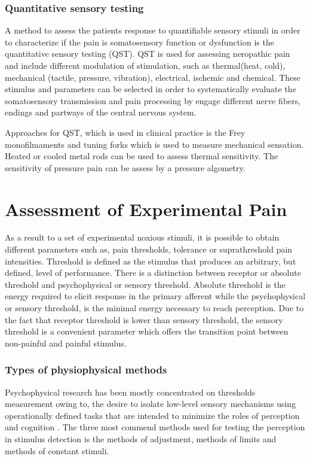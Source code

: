 \subsubsection{Quantitative sensory testing}
A method to assess the patients response to quantifiable sensory stimuli in order to characterize if the pain is somatosensory function or dysfunction is the quantitative sensory testing (QST). QST is used for assessing neropathic pain and include different modulation of stimulation, such as thermal(heat, cold), mechanical (tactile, pressure, vibration), electrical, ischemic and chemical. These stimulus and parameters can be selected in order to systematically evaluate the somatosensory transmission and pain processing by engage different nerve fibers, endings and partways of the central nervous system. \cite{Fillingim2016} 

Approaches for QST, which is used in clinical practice is the Frey monofilmaments and tuning forks which is used to measure mechanical sensation. Heated or cooled metal rods can be used to assess thermal sensitivity. The sensitivity of pressure pain can be assess by a pressure algometry. \cite{Fillingim2016}


\section{Assessment of Experimental Pain}
As a result to a set of experimental noxious stimuli, it is possible to obtain different parameters such as, pain thresholds, tolerance or suprathreshold pain intensities. Threshold is defined as the stimulus that produces an arbitrary, but defined, level of performance. There is a distinction between receptor or absolute threshold and psychophysical or sensory threshold. Absolute threshold is the energy required to elicit response in the primary afferent while the psychophysical or sensory threshold, is the minimal energy necessary to reach perception. Due to the fact that receptor threshold is lower than sensory threshold, the sensory threshold is a convenient parameter which offers the transition point between non-painful and painful stimulus. \cite{Yarnitsky2006}


\subsubsection{Types of physiophysical methods}
Psychophysical research has been mostly concentrated on thresholds measurement owing to, the desire to isolate low-level sensory mechanisms using operationally defined tasks that are intended to minimize the roles of perception and cognition \cite{Pelli2010}. The three most commend methods used for testing the perception in stimulus detection is the methods of adjustment, methods of limits and methods of constant stimuli.

